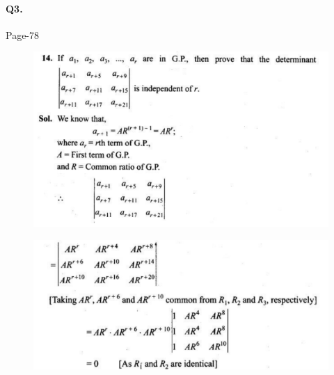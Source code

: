 \documentclass{article}
\begin{document}
\paragraph{Q3.}
\begin{flushright}
Page-78
\end{flushright}
\begin{figure}[H]
    \includegraphics[scale=0.5]{determinants_l5_ps_21.png}
\end{figure}
\begin{figure}[H]
    \includegraphics[scale=0.5]{determinants_l5_ps_22.png}
\end{figure}


\clearpage
\end{document}
